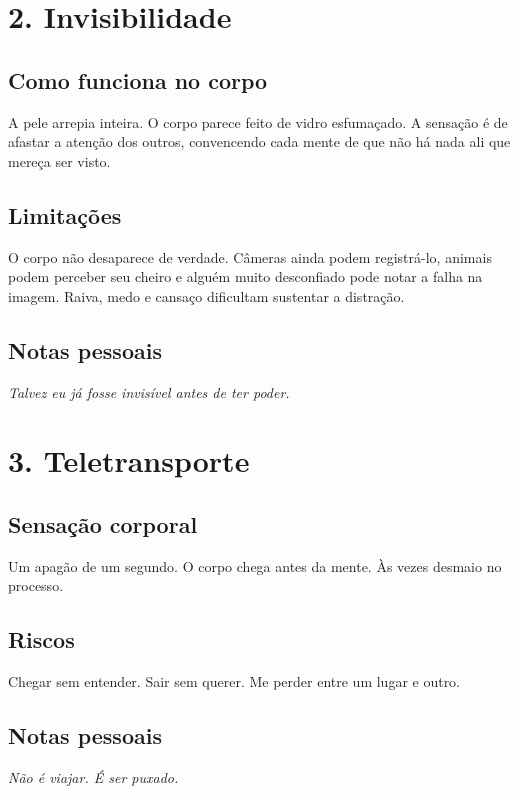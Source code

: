 \section*{2. Invisibilidade}

\subsection*{Como funciona no corpo}
A pele arrepia inteira.  
O corpo parece feito de vidro esfumaçado.  
A sensação é de afastar a atenção dos outros, convencendo cada mente de que não há nada ali que mereça ser visto.

\subsection*{Limitações}
O corpo não desaparece de verdade.
Câmeras ainda podem registrá-lo, animais podem perceber seu cheiro e alguém muito desconfiado pode notar a falha na imagem.
Raiva, medo e cansaço dificultam sustentar a distração.

\subsection*{Notas pessoais}
\textit{Talvez eu já fosse invisível antes de ter poder.}

\section*{3. Teletransporte}

\subsection*{Sensação corporal}
Um apagão de um segundo.  
O corpo chega antes da mente.  
Às vezes desmaio no processo.

\subsection*{Riscos}
Chegar sem entender.  
Sair sem querer.  
Me perder entre um lugar e outro.

\subsection*{Notas pessoais}
\textit{Não é viajar. É ser puxado.}

